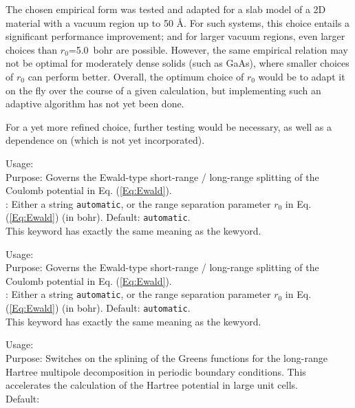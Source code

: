 The chosen empirical form was tested and adapted for a slab model of a
2D material with a vacuum region up to 50 {\AA}. For such systems,
this choice entails a significant performance improvement; and for
larger vacuum regions, even larger choices than $r_0$=5.0~bohr are
possible. However, the same empirical relation may not be optimal for
moderately dense solids (such as GaAs), where smaller choices of
$r_0$ can perform better. Overall, the optimum choice of $r_0$ would
be to adapt it on the fly over the course of a given calculation, but
implementing such an adaptive algorithm has not yet been done.

For a yet more
refined choice, further testing would be necessary, as well as a dependence on
 (which is not yet incorporated).

{
  \noindent
  Usage:  
    \\[1.0ex]
  Purpose: Governs the Ewald-type short-range / long-range splitting
    of the Coulomb potential in Eq. (\ref{Eq:Ewald}). \\[1.0ex]
   : Either a string \texttt{automatic}, or the 
    range separation parameter $r_0$ in Eq. (\ref{Eq:Ewald})
    (in bohr). Default: \texttt{automatic}. \\
}
This keyword has exactly the same meaning as the  kewyord.

{
  \noindent
  Usage:  
    \\[1.0ex]
  Purpose: Governs the Ewald-type short-range / long-range splitting
    of the Coulomb potential in Eq. (\ref{Eq:Ewald}). \\[1.0ex]
   : Either a string \texttt{automatic}, or the 
    range separation parameter $r_0$ in Eq. (\ref{Eq:Ewald})
    (in bohr). Default: \texttt{automatic}. \\
}
This keyword has exactly the same meaning as the  kewyord.

{
  \noindent
  Usage:   \\[1.0ex]
  Purpose: Switches on the splining of the Greens functions for the
  long-range Hartree multipole decomposition in periodic boundary
  conditions. This accelerates the calculation of the Hartree
  potential in large unit cells. \\[1.0ex]
  Default: 
}

